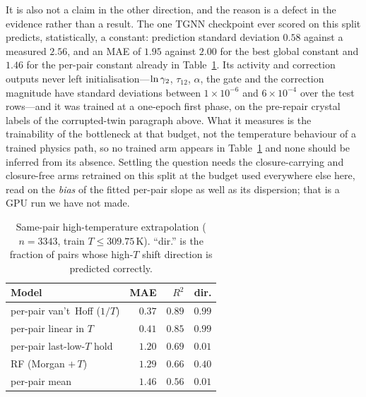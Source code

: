 It is also not a claim in the other direction, and the reason is a defect in the
evidence rather than a result. The one TGNN checkpoint ever scored on this split
predicts, statistically, a constant: prediction standard deviation $0.58$ against a
measured $2.56$, and an MAE of $1.95$ against $2.00$ for the best global constant and
$1.46$ for the per-pair constant already in Table~\ref{tab:si-temp}. Its activity and
correction outputs never left initialisation---$\ln\gamma_2$, $\tau_{12}$, $\alpha$, the gate
and the correction magnitude have standard deviations between $1\times10^{-6}$ and
$6\times10^{-4}$ over the test rows---and it was trained at a one-epoch first phase, on
the pre-repair crystal labels of the corrupted-twin paragraph above. What it measures is the trainability of the
bottleneck at that budget, not the temperature behaviour of a trained physics path, so no
trained arm appears in Table~\ref{tab:si-temp} and none should be inferred from its
absence. Settling the question needs the closure-carrying and closure-free arms retrained
on this split at the budget used everywhere else here, read on the \emph{bias} of the
fitted per-pair slope as well as its dispersion; that is a GPU run we have not made.

\begin{table}[h]
\centering
\caption[Same-pair high-temperature extrapolation]{Same-pair high-temperature extrapolation ($n=3343$, train $T\le309.75$\,K).
``dir.'' is the fraction of pairs whose high-$T$ shift direction is predicted
correctly.}
\label{tab:si-temp}
{\small
\begin{tabular}{lrrr}
\toprule
Model & MAE & $R^2$ & dir. \\
\midrule
per-pair van't~Hoff ($1/T$)     & $0.37$ & $0.89$ & $0.99$ \\
per-pair linear in $T$          & $0.41$ & $0.85$ & $0.99$ \\
per-pair last-low-$T$ hold      & $1.20$ & $0.69$ & $0.01$ \\
RF (Morgan $+\,T$)              & $1.29$ & $0.66$ & $0.40$ \\
per-pair mean                   & $1.46$ & $0.56$ & $0.01$ \\
\bottomrule
\end{tabular}}
\end{table}

